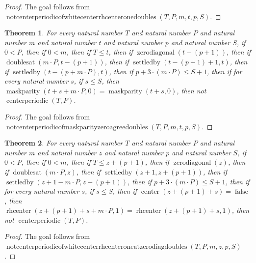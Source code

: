 \documentclass[11pt]{article}
\newtheorem{theorem}{Theorem}[section]
\theoremstyle{definition}
\begin{document}
\begin{proof}
The goal follows from \(\operatorname{notcenterperiodicofwhitecenterrhcenteronedoubles}(T, P, m, t, p, S)\).
\end{proof}
\begin{theorem}
\label{ll:paper:not-centerperiodic-of-maskparity-zero-agree-doubles}
For every natural number \(T\) and natural number \(P\) and natural number \(m\) and natural number \(t\) and natural number \(p\) and natural number \(S\), if \(0 < P\), then if \(0 < m\), then if \(T \le t\), then if \(\operatorname{zerodiagonal}(t - (p + 1))\), then if \(\operatorname{doublesat}(m \cdot P, t - (p + 1))\), then if \(\operatorname{settledby}(t - (p + 1) + 1, t)\), then if \(\operatorname{settledby}(t - (p + m \cdot P), t)\), then if \(p + 3 \cdot (m \cdot P) \le S + 1\), then if for every natural number \(s\), if \(s \le S\), then \(\operatorname{maskparity}(t + s + m \cdot P, 0) = \operatorname{maskparity}(t + s, 0)\), then not \(\operatorname{centerperiodic}(T, P)\).
\end{theorem}
\begin{proof}
The goal follows from \(\operatorname{notcenterperiodicofmaskparityzeroagreedoubles}(T, P, m, t, p, S)\).
\end{proof}
\begin{theorem}
\label{ll:paper:not-centerperiodic-of-white-center-rhcenter-one-at-zero-diag-doubles}
For every natural number \(T\) and natural number \(P\) and natural number \(m\) and natural number \(z\) and natural number \(p\) and natural number \(S\), if \(0 < P\), then if \(0 < m\), then if \(T \le z + (p + 1)\), then if \(\operatorname{zerodiagonal}(z)\), then if \(\operatorname{doublesat}(m \cdot P, z)\), then if \(\operatorname{settledby}(z + 1, z + (p + 1))\), then if \(\operatorname{settledby}(z + 1 - m \cdot P, z + (p + 1))\), then if \(p + 3 \cdot (m \cdot P) \le S + 1\), then if for every natural number \(s\), if \(s \le S\), then if \(\operatorname{center}(z + (p + 1) + s) = \operatorname{false}\), then \(\operatorname{rhcenter}(z + (p + 1) + s + m \cdot P, 1) = \operatorname{rhcenter}(z + (p + 1) + s, 1)\), then not \(\operatorname{centerperiodic}(T, P)\).
\end{theorem}
\begin{proof}
The goal follows from \(\operatorname{notcenterperiodicofwhitecenterrhcenteroneatzerodiagdoubles}(T, P, m, z, p, S)\).
\end{proof}
\end{document}
